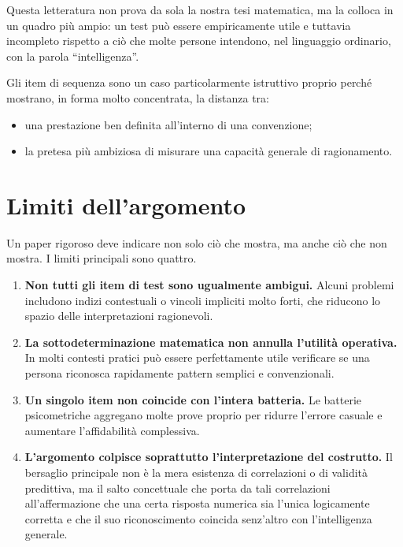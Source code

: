\documentclass[10pt, a4paper]{article}
\theoremstyle{plain}
\theoremstyle{definition}
\theoremstyle{remark}
\begin{document}
Questa letteratura non prova da sola la nostra tesi matematica, ma la colloca in
un quadro più ampio: un test può essere empiricamente utile e tuttavia
incompleto rispetto a ciò che molte persone intendono, nel linguaggio ordinario,
con la parola ``intelligenza''.

Gli item di sequenza sono un caso particolarmente istruttivo proprio perché
mostrano, in forma molto concentrata, la distanza tra:
\begin{itemize}
    \item una prestazione ben definita all'interno di una convenzione;
    \item la pretesa più ambiziosa di misurare una capacità generale di
          ragionamento.
\end{itemize}

\section{Limiti dell'argomento}
\label{sec:limits}

Un paper rigoroso deve indicare non solo ciò che mostra, ma anche ciò che non
mostra. I limiti principali sono quattro.

\begin{enumerate}[label=\arabic*.]
    \item \textbf{Non tutti gli item di test sono ugualmente ambigui.}
          Alcuni problemi includono indizi contestuali o vincoli impliciti molto
          forti, che riducono lo spazio delle interpretazioni ragionevoli.

    \item \textbf{La sottodeterminazione matematica non annulla l'utilità
          operativa.} In molti contesti pratici può essere perfettamente utile
          verificare se una persona riconosca rapidamente pattern semplici e
          convenzionali.

    \item \textbf{Un singolo item non coincide con l'intera batteria.}
          Le batterie psicometriche aggregano molte prove proprio per ridurre
          l'errore casuale e aumentare l'affidabilità complessiva.

    \item \textbf{L'argomento colpisce soprattutto l'interpretazione del
          costrutto.} Il bersaglio principale non è la mera esistenza di
          correlazioni o di validità predittiva, ma il salto concettuale che
          porta da tali correlazioni all'affermazione che una certa risposta
          numerica sia l'unica logicamente corretta e che il suo riconoscimento
          coincida senz'altro con l'intelligenza generale.
\end{enumerate}
\end{document}
